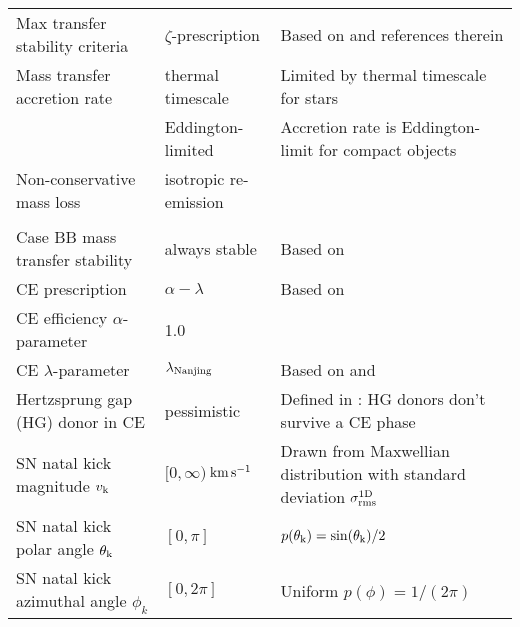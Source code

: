 \documentclass[twocolumn]{aastex631}
\newcommand{\vk}{\ensuremath{v_{\rm{k}}}\xspace}
\newcommand{\thetak}{\ensuremath{{\theta}_{\rm{k}}}\xspace}
\newcommand{\kms}{\ensuremath{\,\rm{km}\,\rm{s}^{-1}}\xspace}
\begin{document}
\begin{table*}[ht!]
{\begin{tabular}{lll}
%
Max transfer stability criteria & $\zeta$-prescription & Based on \citet[][]{Vigna-Gomez_2018} and references therein     \\
%
Mass transfer accretion rate & thermal timescale & Limited by thermal timescale for stars  \citet[][]{Hurley_2002, Vinciguerra_2020} \\
 & Eddington-limited  & Accretion rate is Eddington-limit for compact objects  \\
%
Non-conservative mass loss & isotropic re-emission &  {\citet[][]{Massevitch_1975, Bhattacharya_1991, Soberman_1997}} \\
& &  {\citet{Tauris_2006}} \\
%
Case BB mass transfer stability                                														& always stable         &       Based on  \citet{Tauris_2015, Tauris_2017, Vigna-Gomez_2018}         \\
%
%
CE prescription & $\alpha-\lambda$ & Based on  \citet{Webbink_1984, deKool_1990}  \\
%
CE efficiency $\alpha$-parameter                     												& 1.0                               &              \\
%
CE $\lambda$-parameter                               													& $\lambda_{\rm{Nanjing}}$                             &        Based on \citet{Xu_2010a, Xu_2010b} and  \citet{Dominik_2012}       \\
%
Hertzsprung gap (HG) donor in {CE}                       														& pessimistic                       &  Defined in \citet{Dominik_2012}:  HG donors don't survive a {CE}  phase        \\
%
%
{SN} natal kick magnitude \vk                          									& $[0, \infty)$\kms & Drawn from Maxwellian distribution with standard deviation $\sigma_{\rm{rms}}^{\rm{1D}}$          \\
%
 {SN} natal kick polar angle $\thetak$          											& $[0, \pi]$                        & $p(\thetak) = \sin(\thetak)/2$ \\
%
 {SN} natal kick azimuthal angle $\phi_k$                           					  	& $[0, 2\pi]$                        & Uniform $p(\phi) = 1/ (2 \pi)$   \\

\end{tabular}}
\end{table*}
\end{document}
